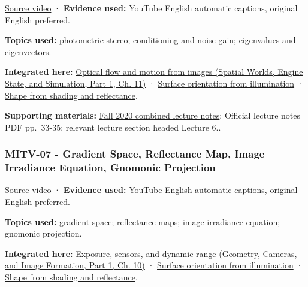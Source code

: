 \hypertarget{04-visual-computing-ii-ch036-mitv-06---photometric-stereo-noise-gain-error-amplification-eigenvalues-and-eigenvectors-review}{}

\href{https://www.youtube.com/watch?v=OOrT17RsVxE}{Source video} · \textbf{Evidence used:} YouTube English automatic captions, original English preferred.

\textbf{Topics used:} photometric stereo; conditioning and noise gain; eigenvalues and eigenvectors.

\textbf{Integrated here:} \href{../05-Spatial-Worlds-Engine-State-and-Simulation-P01/main.pdf\#nameddest=04-visual-computing-ii-ch030-optical-flow-and-motion-from-images}{Optical flow and motion from images (Spatial Worlds, Engine State, and Simulation, Part 1, Ch. 11)} · \hyperref[04-visual-computing-ii-ch032-surface-orientation-from-illumination]{Surface orientation from illumination} · \hyperref[04-visual-computing-ii-ch032-shape-from-shading-and-reflectance]{Shape from shading and reflectance}.

\textbf{Supporting materials:} \href{https://ocw.mit.edu/courses/6-801-machine-vision-fall-2020/9ec44f69e72995c370b3797818ba01e6_MIT6_801F20_lectureNotes.pdf}{Fall 2020 combined lecture notes}: Official lecture notes PDF pp.~33-35; relevant lecture section headed Lecture 6..

\subsubsection{MITV-07 - Gradient Space, Reflectance Map, Image Irradiance Equation, Gnomonic Projection}\label{04-visual-computing-ii-ch036-mitv-07---gradient-space-reflectance-map-image-irradiance-equation-gnomonic-projection}

\hypertarget{04-visual-computing-ii-ch036-mitv-07---gradient-space-reflectance-map-image-irradiance-equation-gnomonic-projection}{}

\href{https://www.youtube.com/watch?v=qqtEQsBjh28}{Source video} · \textbf{Evidence used:} YouTube English automatic captions, original English preferred.

\textbf{Topics used:} gradient space; reflectance maps; image irradiance equation; gnomonic projection.

\textbf{Integrated here:} \href{../03-Geometry-Cameras-and-Image-Formation-P01/main.pdf\#nameddest=03-visual-computing-i-ch003-exposure-sensors-and-dynamic-range}{Exposure, sensors, and dynamic range (Geometry, Cameras, and Image Formation, Part 1, Ch. 10)} · \hyperref[04-visual-computing-ii-ch032-surface-orientation-from-illumination]{Surface orientation from illumination} · \hyperref[04-visual-computing-ii-ch032-shape-from-shading-and-reflectance]{Shape from shading and reflectance}.


